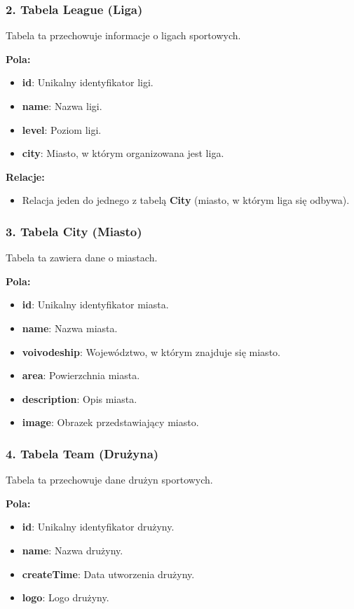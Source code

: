 \documentclass[wmii,inf,inz]{uwmthesis} %
\newenvironment{indenteditemize}
{\begin{itemize}[left=1cm]} %
{\end{itemize}}
\begin{document}
\subsubsection{2. Tabela League (Liga)}
Tabela ta przechowuje informacje o ligach sportowych.

\textbf{Pola:}
\begin{indenteditemize}
    \item \textbf{id}: Unikalny identyfikator ligi.
    \item \textbf{name}: Nazwa ligi.
    \item \textbf{level}: Poziom ligi.
    \item \textbf{city}: Miasto, w którym organizowana jest liga.
\end{indenteditemize}

\textbf{Relacje:}
\begin{indenteditemize}
    \item Relacja jeden do jednego z tabelą \textbf{City} (miasto, w którym liga się odbywa).
\end{indenteditemize}

\subsubsection{3. Tabela City (Miasto)}
Tabela ta zawiera dane o miastach.

\textbf{Pola:}
\begin{indenteditemize}
    \item \textbf{id}: Unikalny identyfikator miasta.
    \item \textbf{name}: Nazwa miasta.
    \item \textbf{voivodeship}: Województwo, w którym znajduje się miasto.
    \item \textbf{area}: Powierzchnia miasta.
    \item \textbf{description}: Opis miasta.
    \item \textbf{image}: Obrazek przedstawiający miasto.
\end{indenteditemize}

\subsubsection{4. Tabela Team (Drużyna)}
Tabela ta przechowuje dane drużyn sportowych.

\textbf{Pola:}
\begin{indenteditemize}
    \item \textbf{id}: Unikalny identyfikator drużyny.
    \item \textbf{name}: Nazwa drużyny.
    \item \textbf{createTime}: Data utworzenia drużyny.
    \item \textbf{logo}: Logo drużyny.
\end{indenteditemize}
\end{document}
